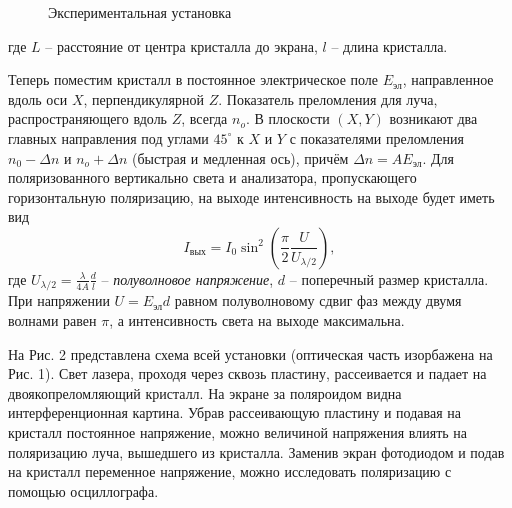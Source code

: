\documentclass[a4paper,12pt]{article}
\begin{document}
\begin{figure}[h]
 \caption{\centering Экспериментальная установка}
	\label{fig:image1}
\end{figure}

где $L$ -- расстояние от центра кристалла до экрана, $l$ -- длина кристалла.

Теперь поместим кристалл в постоянное электрическое поле $E_{\text{эл}}$, направленное вдоль оси $X$, перпендикулярной $Z$. Показатель преломления для луча, распространяющего вдоль $Z$, всегда $n_o$. В плоскости $(X,Y)$ возникают два главных направления под углами $45^\circ$ к $X$ и $Y$ с показателями преломления $n_0 - \Delta n$ и $n_o + \Delta n$ (быстрая и медленная ось), причём $\Delta n = A E_{\text{эл}}$. Для поляризованного вертикально света и анализатора, пропускающего горизонтальную поляризацию, на выходе интенсивность на выходе будет иметь вид
\begin{equation}
I_{\text{вых}} = I_0 \sin^2 \left(\dfrac{\pi}{2} \dfrac{U}{U_{\lambda/2}} \right),
\end{equation}
где $\displaystyle U_{\lambda/2} = \frac{\lambda}{4A}\frac{d}{l}$ -- \textit{полуволновое напряжение}, $d$ -- поперечный размер кристалла.  При напряжении $U = E_{\text{эл}}d$ равном полуволновому сдвиг фаз между двумя волнами равен $\pi$, а интенсивность света на выходе максимальна.


На Рис. 2 представлена схема всей установки (оптическая часть изорбажена на Рис. 1). Свет лазера, проходя через сквозь пластину, рассеивается и падает на двоякопреломляющий кристалл. На экране за поляроидом видна интерференционная картина. Убрав рассеивающую пластину и подавая на кристалл постоянное напряжение, можно величиной напряжения влиять на поляризацию луча, вышедшего из кристалла. Заменив экран фотодиодом и подав на кристалл переменное напряжение, можно исследовать поляризацию с помощью осциллографа.
\end{document}
